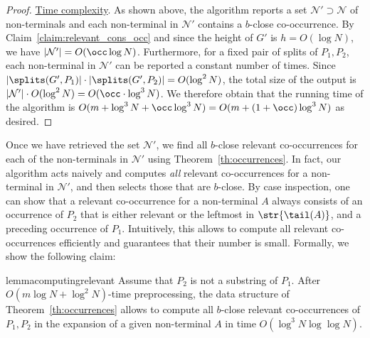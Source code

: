 \begin{proof}
{\underline{Time complexity}}. 
As shown above, the algorithm reports a set $\mathcal{N}' \supset \mathcal{N}$ of non-terminals and each non-terminal in $\mathcal{N}'$ contains a $b$-close co-occurrence. By Claim~\ref{claim:relevant_cons_occ} and since the height of $G'$ is $h = O(\log N)$, we have $|\mathcal{N}'| = O(\occ \log N)$. Furthermore, for a fixed pair of splits of $P_1,P_2$, each non-terminal in $\mathcal{N}'$ can be reported a constant number of times. Since $|\splits(G',P_1)| \cdot |\splits(G',P_2)| = O(\log^2 N)$, the total size of the output is $|\mathcal{N}'| \cdot O(\log^2 N) = O(\occ \cdot \log^3 N)$. We therefore obtain that the running time of the algorithm is $O(m+\log^3 N + \occ \log^3 N) = O(m+(1+\occ)\log^3 N)$ as desired. 
\end{proof}

Once we have retrieved the set $\mathcal{N}'$, we find all $b$-close relevant co-occurrences for each of the non-terminals in $\mathcal{N}'$ using Theorem~\ref{th:occurrences}. In fact, our algorithm acts naively and computes \emph{all} relevant co-occurrences for a non-terminal in $\mathcal{N}'$, and then selects those that are $b$-close. By case inspection, one can show that a relevant co-occurrence for a non-terminal $A$ always consists of an occurrence of $P_2$ that is either relevant or the leftmost in $\str{\tail(A)}$, and a preceding occurrence of $P_1$. Intuitively, this allows to compute all relevant co-occurrences efficiently and guarantees that their number is small. Formally, we show the following claim: 

\begin{restatable}{lemma}{computingrelevant}\label{lem:relevant_co_occurr_A}
Assume that $P_2$ is not a substring of $P_1$. After $O(m \log N + \log^2 N)$-time preprocessing, the data structure of Theorem~\ref{th:occurrences} allows to compute all $b$-close relevant co-occurrences of $P_1, P_2$ in the expansion of a given non-terminal $A$ in time $O(\log^{3} N \log\log N)$. 
\end{restatable}

